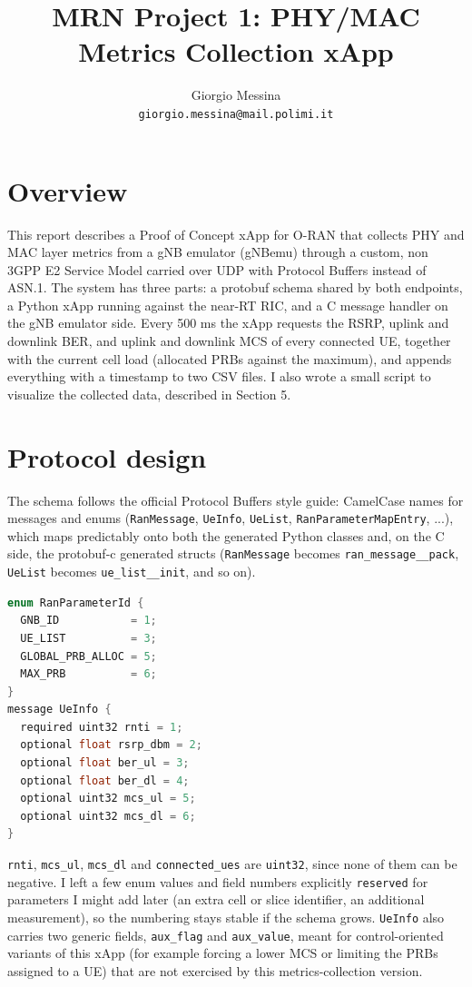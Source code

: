 \documentclass[11pt]{article}
\title{MRN Project 1: PHY/MAC Metrics Collection xApp}
\author{Giorgio Messina \\ \texttt{giorgio.messina@mail.polimi.it}}
\date{}
\begin{document}
\maketitle
\vspace{-1.5cm}

\section{Overview}
This report describes a Proof of Concept xApp for O-RAN that collects PHY and MAC layer metrics from a gNB emulator (gNBemu) through a custom, non 3GPP E2 Service Model carried over UDP with Protocol Buffers instead of ASN.1. The system has three parts: a protobuf schema shared by both endpoints, a Python xApp running against the near-RT RIC, and a C message handler on the gNB emulator side. Every 500 ms the xApp requests the RSRP, uplink and downlink BER, and uplink and downlink MCS of every connected UE, together with the current cell load (allocated PRBs against the maximum), and appends everything with a timestamp to two CSV files. I also wrote a small script to visualize the collected data, described in Section 5.

\section{Protocol design}
The schema follows the official Protocol Buffers style guide: CamelCase names for messages and enums (\texttt{RanMessage}, \texttt{UeInfo}, \texttt{UeList}, \texttt{RanParameterMapEntry}, ...), which maps predictably onto both the generated Python classes and, on the C side, the protobuf-c generated structs (\texttt{RanMessage} becomes \texttt{ran\_message\_\_pack}, \texttt{UeList} becomes \texttt{ue\_list\_\_init}, and so on).

\begin{lstlisting}[language=C]
enum RanParameterId {
  GNB_ID           = 1;
  UE_LIST          = 3;
  GLOBAL_PRB_ALLOC = 5;
  MAX_PRB          = 6;
}
message UeInfo {
  required uint32 rnti = 1;
  optional float rsrp_dbm = 2;
  optional float ber_ul = 3;
  optional float ber_dl = 4;
  optional uint32 mcs_ul = 5;
  optional uint32 mcs_dl = 6;
}
\end{lstlisting}

\texttt{rnti}, \texttt{mcs\_ul}, \texttt{mcs\_dl} and \texttt{connected\_ues} are \texttt{uint32}, since none of them can be negative. I left a few enum values and field numbers explicitly \texttt{reserved} for parameters I might add later (an extra cell or slice identifier, an additional measurement), so the numbering stays stable if the schema grows. \texttt{UeInfo} also carries two generic fields, \texttt{aux\_flag} and \texttt{aux\_value}, meant for control-oriented variants of this xApp (for example forcing a lower MCS or limiting the PRBs assigned to a UE) that are not exercised by this metrics-collection version.
\end{document}
